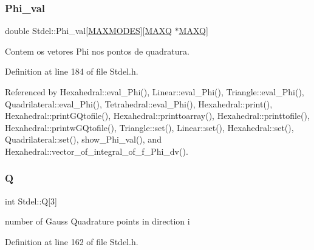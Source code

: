 \mbox{\label{classStdel_ab7849f154bd766857aac9557c19f7f84}} 
\subsubsection{\texorpdfstring{Phi\+\_\+val}{Phi\_val}}
{\footnotesize\ttfamily double Stdel\+::\+Phi\+\_\+val\mbox{[}\hyperlink{MyOptions_8h_aa75ccd382acf88cec3e9c8025c1f88b7}{M\+A\+X\+M\+O\+D\+ES}\mbox{]}\mbox{[}\hyperlink{MyOptions_8h_af708e94d886ba3f59582612949cac702}{M\+A\+XQ} $\ast$\hyperlink{MyOptions_8h_af708e94d886ba3f59582612949cac702}{M\+A\+XQ}\mbox{]}\hspace{0.3cm}{\ttfamily [protected]}}



Contem os vetores Phi nos pontos de quadratura. 



Definition at line 184 of file Stdel.\+h.



Referenced by Hexahedral\+::eval\+\_\+\+Phi(), Linear\+::eval\+\_\+\+Phi(), Triangle\+::eval\+\_\+\+Phi(), Quadrilateral\+::eval\+\_\+\+Phi(), Tetrahedral\+::eval\+\_\+\+Phi(), Hexahedral\+::print(), Hexahedral\+::print\+G\+Qtofile(), Hexahedral\+::printtoarray(), Hexahedral\+::printtofile(), Hexahedral\+::printw\+G\+Qtofile(), Triangle\+::set(), Linear\+::set(), Hexahedral\+::set(), Quadrilateral\+::set(), show\+\_\+\+Phi\+\_\+val(), and Hexahedral\+::vector\+\_\+of\+\_\+integral\+\_\+of\+\_\+f\+\_\+\+Phi\+\_\+dv().

\mbox{\label{classStdel_a82074e598ad5af5ec45a3257a3c2b684}} 
\subsubsection{\texorpdfstring{Q}{Q}}
{\footnotesize\ttfamily int Stdel\+::Q\mbox{[}3\mbox{]}\hspace{0.3cm}{\ttfamily [protected]}}



number of Gauss Quadrature points in direction i 



Definition at line 162 of file Stdel.\+h.



